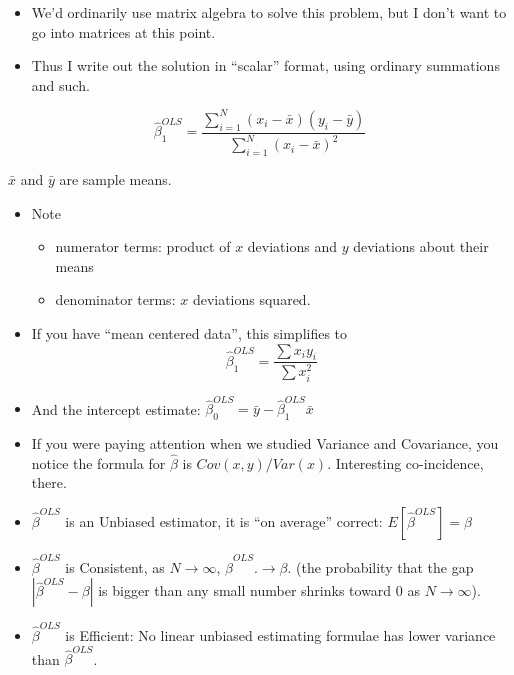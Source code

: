 \documentclass[10pt,english]{beamer}
\def\lyxframeend{} %
\begin{document}
\lyxframeend{}
\begin{itemize}
\item We'd ordinarily use matrix algebra to solve this problem, but I don't
want to go into matrices at this point.
\item Thus I write out the solution in ``scalar'' format, using ordinary
summations and such.
\end{itemize}
\begin{equation}
\hat{\beta}_{1}^{OLS}=\frac{\sum_{i=1}^{N}(x_{i}-\bar{x})(y_{i}-\bar{y})}{\sum_{i=1}^{N}(x_{i}-\bar{x})^{2}}\label{bhat-1}
\end{equation}


$\bar{x}$ and $\bar{y}$ are sample means. 
\begin{itemize}
\item Note

\begin{itemize}
\item numerator terms: product of $x$ deviations and $y$ deviations about
their means
\item denominator terms: $x$ deviations squared.
\end{itemize}
\item If you have ``mean centered data'', this simplifies to
\begin{equation}
\hat{\beta}_{1}^{OLS}=\frac{\sum x_{i}y_{i}}{\sum x_{i}^{2}}
\end{equation}

\item And the intercept estimate: $\hat{\beta}_{0}^{OLS}=\bar{y}-\hat{\beta}_{1}^{OLS}\bar{x}$
\item If you were paying attention when we studied Variance and Covariance,
you notice the formula for $\hat{\beta}$ is $Cov(x,y)/Var(x)$. Interesting
co-incidence, there.
\end{itemize}

\lyxframeend{}
\begin{itemize}
\item $\hat{\beta}^{OLS}$ is an \alert{Unbiased} estimator, it is ``on
average'' correct: $E[\hat{\beta}^{OLS}]=\beta$
\item $\hat{\beta}^{OLS}$ is \alert{Consistent}, as $N\rightarrow\infty$,
$\hat{\beta}^{OLS}.\rightarrow\beta$. (the probability that the gap
$|\hat{\beta}^{OLS}-\beta|$ is bigger than any small number shrinks
toward $0$ as $N\rightarrow\infty$).
\item $\hat{\beta}^{OLS}$ is \alert{Efficient}: No linear unbiased estimating
formulae has lower variance than $\hat{\beta}^{OLS}$.
\end{itemize}
\end{document}
